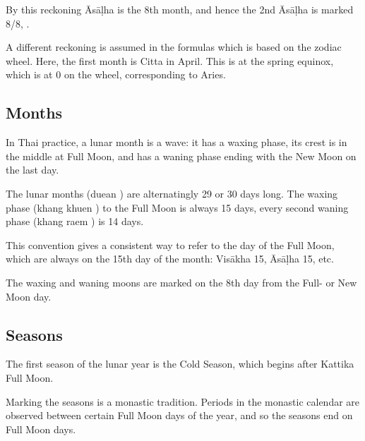 \documentclass[11pt,oneside]{memoir-article}
\begin{document}
By this reckoning Āsāḷha is the 8th month, and hence the 2nd Āsāḷha is marked
8/8, .

A different reckoning is assumed in the formulas which is based on the zodiac
wheel. Here, the first month is Citta in April. This is at the spring equinox,
which is at 0\degrees{} on the wheel, corresponding to Aries.

\subsection{Months}
\label{sec-3-2-2}

In Thai practice, a lunar month is a wave: it has a waxing phase, its crest is
in the middle at Full Moon, and has a waning phase ending with the New Moon on
the last day.

The lunar months (duean ) are alternatingly 29 or 30 days long. The
waxing phase (khang khuen ) to the Full Moon is always 15 days,
every second waning phase (khang raem ) is 14 days.\autocite{wp-thai-lunar-calendar}

This convention gives a consistent way to refer to the day of the Full Moon,
which are always on the 15th day of the month: Visākha 15, Āsāḷha 15, etc.

The waxing and waning moons are marked on the 8th day from the Full- or New Moon
day.

\clearpage

\subsection{Seasons}
\label{sec-3-2-3}


The first season of the lunar year is the Cold Season, which begins after
Kattika Full Moon.

Marking the seasons is a monastic tradition. Periods in the monastic calendar
are observed between certain Full Moon days of the year, and so the seasons end
on Full Moon days.
\end{document}
